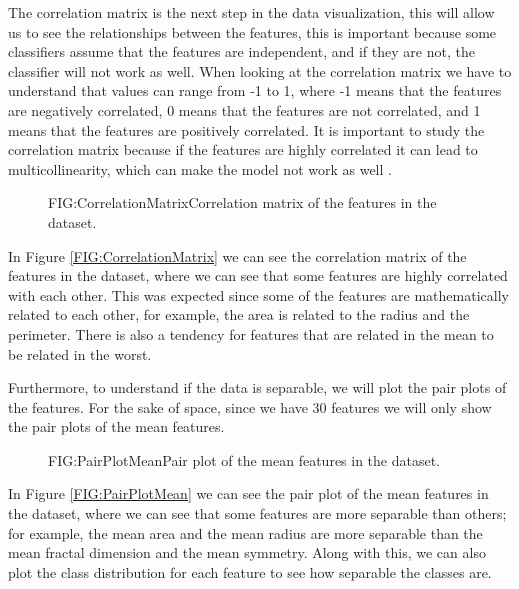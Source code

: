 The correlation matrix is the next step in the data visualization, this will allow us to see the relationships between the features, this is important because some classifiers assume that the features are independent, and if they are not, the classifier will not work as well. When looking at the correlation matrix we have to understand that values can range from -1 to 1, where -1 means that the features are negatively correlated, 0 means that the features are not correlated, and 1 means that the features are positively correlated. It is important to study the correlation matrix because if the features are highly correlated it can lead to multicollinearity, which can make the model not work as well \cite{belsley_regression_2005}.

\begin{figure}[Correlation Matrix]{FIG:CorrelationMatrix}{Correlation matrix of the features in the dataset.}
\end{figure}

In Figure \ref{FIG:CorrelationMatrix} we can see the correlation matrix of the features in the dataset, where we can see that some features are highly correlated with each other. This was expected since some of the features are mathematically related to each other, for example, the area is related to the radius and the perimeter. There is also a tendency for features that are related in the mean to be related in the worst. 

Furthermore, to understand if the data is separable, we will plot the pair plots of the features. For the sake of space, since we have 30 features we will only show the pair plots of the mean features.

\begin{figure}[Pair Plot of the Mean Features]{FIG:PairPlotMean}{Pair plot of the mean features in the dataset.}

\end{figure}

In Figure \ref{FIG:PairPlotMean} we can see the pair plot of the mean features in the dataset, where we can see that some features are more separable than others; for example, the mean area and the mean radius are more separable than the mean fractal dimension and the mean symmetry. Along with this, we can also plot the class distribution for each feature to see how separable the classes are. 

